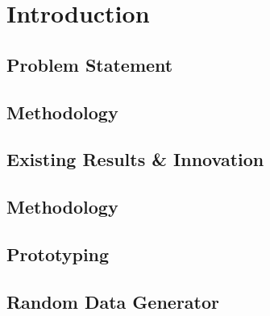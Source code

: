 \chapter{Introduction}\label{ch:introduction}

\section{Problem Statement}


\section{Methodology}


\section {Existing Results \& Innovation}\label{sec:existing_results_innovation}


\section{Methodology}\label{sec:methodology}

\section{Prototyping}\label{sec:prototyping}

\section{Random Data Generator}\label{sec:random_data_generator}
